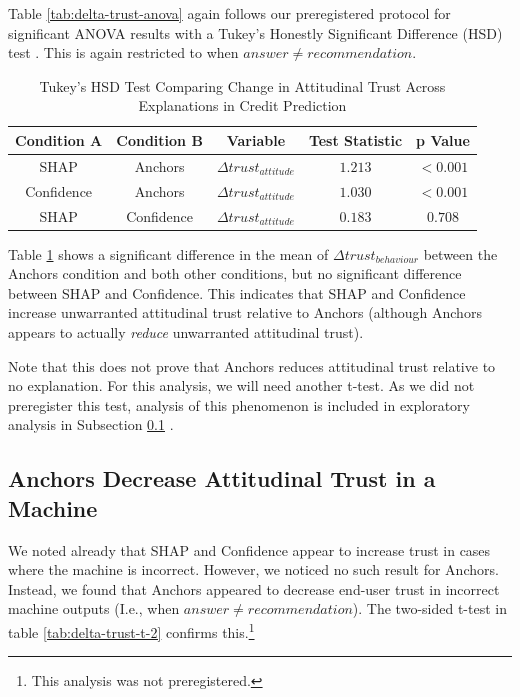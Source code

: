 Table \ref{tab:delta-trust-anova} again follows our preregistered protocol for significant ANOVA results with a Tukey's Honestly Significant Difference (HSD) test \cite{natarajan_binns_2022}. This is again restricted to when $answer \neq recommendation$.

\begin{table}[htbp]
    \caption{Tukey's HSD Test Comparing Change in Attitudinal Trust Across Explanations in Credit Prediction}
    \begin{center}
    \begin{tabular}{ccccc}
        \toprule
        Condition A & Condition B & Variable & Test Statistic & p Value \\
        \midrule
        SHAP & Anchors & $\Delta trust_{attitude}$ & $\mathbf{1.213}$ & $\mathbf{<0.001}$ \\
        Confidence & Anchors & $\Delta trust_{attitude}$ & $\mathbf{1.030}$ & $\mathbf{<0.001}$ \\
        SHAP & Confidence & $\Delta trust_{attitude}$ & $0.183$ & $0.708$ \\
        \bottomrule
    \end{tabular}
    \label{tab:delta-trust-hsd-2}
    \end{center}
\end{table}

Table \ref{tab:delta-trust-hsd-2} shows a significant difference in the mean of $\Delta trust_{behaviour}$ between the Anchors condition and both other conditions, but no significant difference between SHAP and Confidence. This indicates that SHAP and Confidence increase unwarranted attitudinal trust relative to Anchors (although Anchors appears to actually \emph{reduce} unwarranted attitudinal trust).

Note that this does not prove that Anchors reduces attitudinal trust relative to no explanation. For this analysis, we will need another t-test. As we did not preregister this test, analysis of this phenomenon is included in exploratory analysis in Subsection \ref{ssec:anchors-decrease} \cite{natarajan_binns_2022}.

\subsection{Anchors Decrease Attitudinal Trust in a Machine}\label{ssec:anchors-decrease}
We noted already that SHAP and Confidence appear to increase trust in cases where the machine is incorrect. However, we noticed no such result for Anchors. Instead, we found that Anchors appeared to decrease end-user trust in incorrect machine outputs (I.e., when $answer \neq recommendation$). The two-sided t-test in table \ref{tab:delta-trust-t-2} confirms this.\footnote{This analysis was not preregistered.}

